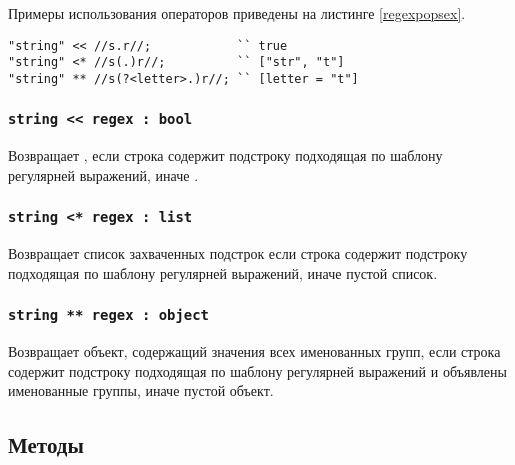 Примеры использования операторов приведены на листинге \ref{regexpopsex}.

\begin{sourcecode}
\label{regexpopsex}
\begin{verbatim}
"string" << //s.r//;            `` true
"string" <* //s(.)r//;          `` ["str", "t"]
"string" ** //s(?<letter>.)r//; `` [letter = "t"]
\end{verbatim}
\end{sourcecode}

\subsubsection{\texttt{string << regex : bool}}

Возвращает \true{}, если строка содержит подстроку подходящая по шаблону регулярней выражений, иначе \false{}.

\subsubsection{\texttt{string <* regex : list}}

Возвращает список захваченных подстрок если строка содержит подстроку подходящая по шаблону регулярней выражений, иначе пустой список.

\subsubsection{\texttt{string ** regex : object}}

Возвращает объект, содержащий значения всех именованных групп, если строка содержит подстроку подходящая по шаблону регулярней выражений и объявлены именованные группы, иначе пустой объект.


\subsection{Методы}

